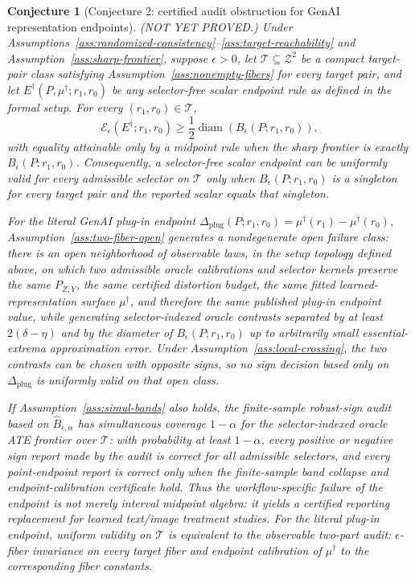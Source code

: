 \documentclass[11pt]{article}
\theoremstyle{definition}
\theoremstyle{plain}
\newtheorem{conjecture}{Conjecture}
\theoremstyle{remark}
\begin{document}
\begin{conjecture}[Conjecture 2: certified audit obstruction for GenAI representation endpoints]\label{conj:audit-impossibility}
(NOT YET PROVED.)  Under Assumptions~\ref{ass:randomized-consistency}--\ref{ass:target-reachability} and Assumption~\ref{ass:sharp-frontier}, suppose \(\epsilon>0\), let \(\mathcal T\subseteq\mathcal Z^2\) be a compact target-pair class satisfying Assumption~\ref{ass:nonempty-fibers} for every target pair, and let \(E^\dagger(P,\mu^\dagger;r_1,r_0)\) be any selector-free scalar endpoint rule as defined in the formal setup.  For every \((r_1,r_0)\in\mathcal T\),
\[
\mathcal E_\epsilon(E^\dagger;r_1,r_0)
\ge
\frac{1}{2}\operatorname{diam}\!\left(B_\epsilon(P;r_1,r_0)\right),
\]
with equality attainable only by a midpoint rule when the sharp frontier is exactly \(B_\epsilon(P;r_1,r_0)\).  Consequently, a selector-free scalar endpoint can be uniformly valid for every admissible selector on \(\mathcal T\) only when \(B_\epsilon(P;r_1,r_0)\) is a singleton for every target pair and the reported scalar equals that singleton.

For the literal GenAI plug-in endpoint \(\Delta_{\mathrm{plug}}(P;r_1,r_0)=\mu^\dagger(r_1)-\mu^\dagger(r_0)\), Assumption~\ref{ass:two-fiber-open} generates a nondegenerate open failure class: there is an open neighborhood of observable laws, in the setup topology defined above, on which two admissible oracle calibrations and selector kernels preserve the same \(P_{Z,Y}\), the same certified distortion budget, the same fitted learned-representation surface \(\mu^\dagger\), and therefore the same published plug-in endpoint value, while generating selector-indexed oracle contrasts separated by at least \(2(\delta-\eta)\) and by the diameter of \(B_\epsilon(P;r_1,r_0)\) up to arbitrarily small essential-extrema approximation error.  Under Assumption~\ref{ass:local-crossing}, the two contrasts can be chosen with opposite signs, so no sign decision based only on \(\Delta_{\mathrm{plug}}\) is uniformly valid on that open class.

If Assumption~\ref{ass:simul-bands} also holds, the finite-sample robust-sign audit based on \(\widehat B_{\epsilon,\alpha}\) has simultaneous coverage \(1-\alpha\) for the selector-indexed oracle ATE frontier over \(\mathcal T\): with probability at least \(1-\alpha\), every positive or negative sign report made by the audit is correct for all admissible selectors, and every point-endpoint report is correct only when the finite-sample band collapse and endpoint-calibration certificate hold.  Thus the workflow-specific failure of the \citet{ImaiNakamura2024TextTreatments} endpoint is not merely interval midpoint algebra: it yields a certified reporting replacement for learned text/image treatment studies.  For the literal plug-in endpoint, uniform validity on \(\mathcal T\) is equivalent to the observable two-part audit: \(\epsilon\)-fiber invariance on every target fiber and endpoint calibration of \(\mu^\dagger\) to the corresponding fiber constants.
\end{conjecture}
\end{document}
